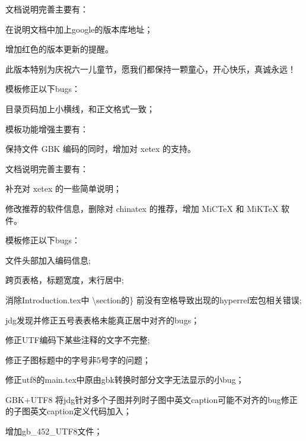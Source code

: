文档说明完善主要有：
\begin{hitlist}
   \item 在说明文档中加上google的版本库地址；
   \item 增加红色的版本更新的提醒。
\end{hitlist}


此版本特别为庆祝六一儿童节，愿我们都保持一颗童心，开心快乐，真诚永远！

模板修正以下bugs：
\begin{hitlist}
    \item 目录页码加上小横线，和正文格式一致；
\end{hitlist}


模板功能增强主要有：
\begin{hitlist}
    \item 保持文件 GBK 编码的同时，增加对 xetex 的支持。
\end{hitlist}

文档说明完善主要有：
\begin{hitlist}
   \item 补充对 xetex 的一些简单说明；
   \item 修改推荐的软件信息，删除对 chinatex 的推荐，增加 MiCTeX 和 MiKTeX 软件。
\end{hitlist}

模板修正以下bugs：
\begin{hitlist}
    \item 文件头部加入编码信息;
    \item 跨页表格，标题宽度，末行居中;
    \item 消除Introduction.tex中 \textbackslash section的\} 前没有空格导致出现的hyperref宏包相关错误; 
    \item jdg发现并修正五号表表格未能真正居中对齐的bugs；
    \item 修正UTF编码下某些注释的文字不完整;
    \item 修正子图标题中的字号非5号字的问题； 
    \item 修正utf8的main.tex中原由gbk转换时部分文字无法显示的小bug；
    \item [GBK+UTF8]将jdg针对多个子图并列时子图中英文caption可能不对齐的bug修正的子图英文caption定义代码加入；
    \item 增加gb\_452\_UTF8文件；
\end{hitlist}


